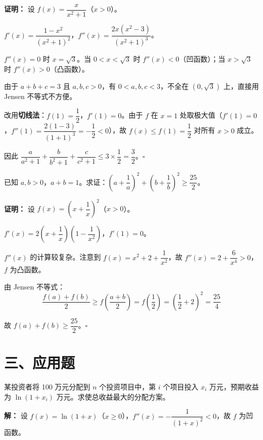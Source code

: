 \documentclass[12pt, a4paper]{ctexart}
\begin{document}
\textbf{证明：} 设 $f(x) = \dfrac{x}{x^2 + 1}$（$x > 0$）。

$f'(x) = \dfrac{1 - x^2}{(x^2 + 1)^2}$，$f''(x) = \dfrac{2x(x^2 - 3)}{(x^2 + 1)^3}$。

$f''(x) = 0$ 时 $x = \sqrt{3}$。当 $0 < x < \sqrt{3}$ 时 $f''(x) < 0$（凹函数）；当 $x > \sqrt{3}$ 时 $f''(x) > 0$（凸函数）。

由于 $a + b + c = 3$ 且 $a, b, c > 0$，有 $0 < a, b, c < 3$，不全在 $(0, \sqrt{3})$ 上，直接用 Jensen 不等式不方便。

改用\textbf{切线法}：$f(1) = \dfrac{1}{2}$，$f'(1) = 0$。由于 $f$ 在 $x = 1$ 处取极大值（$f'(1) = 0$，$f''(1) = \dfrac{2(1 - 3)}{(1 + 1)^3} = -\dfrac{1}{2} < 0$），故 $f(x) \leq f(1) = \dfrac{1}{2}$ 对所有 $x > 0$ 成立。

因此 $\dfrac{a}{a^2 + 1} + \dfrac{b}{b^2 + 1} + \dfrac{c}{c^2 + 1} \leq 3 \times \dfrac{1}{2} = \dfrac{3}{2}$。$\square$

\begin{examplebox}
已知 $a, b > 0$，$a + b = 1$。求证：$\left(a + \dfrac{1}{a}\right)^2 + \left(b + \dfrac{1}{b}\right)^2 \geq \dfrac{25}{2}$。
\end{examplebox}

\textbf{证明：} 设 $f(x) = \left(x + \dfrac{1}{x}\right)^2$（$x > 0$）。

$f'(x) = 2\left(x + \dfrac{1}{x}\right)\left(1 - \dfrac{1}{x^2}\right)$，$f'(1) = 0$。

$f''(x)$ 的计算较复杂。注意到 $f(x) = x^2 + 2 + \dfrac{1}{x^2}$，故 $f''(x) = 2 + \dfrac{6}{x^4} > 0$，$f$ 为凸函数。

由 Jensen 不等式：
$$\frac{f(a) + f(b)}{2} \geq f\!\left(\frac{a + b}{2}\right) = f\!\left(\frac{1}{2}\right) = \left(\frac{1}{2} + 2\right)^2 = \frac{25}{4}$$

故 $f(a) + f(b) \geq \dfrac{25}{2}$。$\square$

\section*{\textcolor{apppurple}{三、应用题}}

\begin{appbox}[【应用1】最优投资组合]
某投资者将 100 万元分配到 $n$ 个投资项目中，第 $i$ 个项目投入 $x_i$ 万元，预期收益为 $\ln(1 + x_i)$ 万元。求使总收益最大的分配方案。
\end{appbox}

\textbf{解：} 设 $f(x) = \ln(1 + x)$（$x \geq 0$），$f''(x) = -\dfrac{1}{(1 + x)^2} < 0$，故 $f$ 为凹函数。
\end{document}
